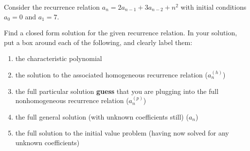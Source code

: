 \documentclass[11pt]{amsart}
\newcommand{\be}{\begin{enumerate}}
\newcommand{\ee}{\end{enumerate}}
\begin{document}
\item Consider the recurrence relation $a_n = 2a_{n-1} + 3 a_{n-2} + n^2$ with initial conditions $a_0= 0$ and $a_1 = 7$.

Find a closed form solution for the given recurrence relation. In your solution, put a box around each of the following, and clearly label them:
\be
	\item the characteristic polynomial
	\item the solution to the associated homogeneous recurrence relation ($a_n^{(h)}$)
	\item the full particular solution \textbf{guess} that you are plugging into the full nonhomogeneous recurrence relation ($a_n^{(p)}$)
	\item the full general solution (with unknown coefficients still) ($a_n$)
	\item the full solution to the initial value problem (having now solved for any unknown coefficients)
\ee
\end{document}

